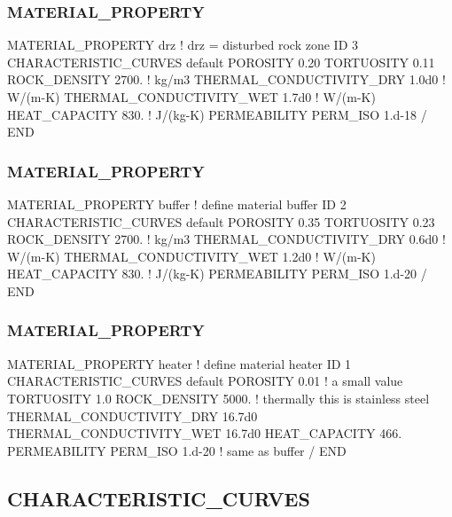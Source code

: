 \documentclass{beamer}
\newcommand\bluecomment[1]{{{\color{blue} #1}}}
\newcommand\greencomment[1]{{{\color{green} #1}}}
\begin{document}
\begin{frame}[fragile]\frametitle{MATERIAL\_PROPERTY}
\begin{semiverbatim}
MATERIAL_PROPERTY drz \bluecomment{!} \greencomment{drz} \bluecomment{= disturbed rock zone}
  ID 3
  CHARACTERISTIC_CURVES default
  POROSITY 0.20
  TORTUOSITY 0.11
  ROCK_DENSITY 2700. \bluecomment{! kg/m3}
  THERMAL_CONDUCTIVITY_DRY 1.0d0 \bluecomment{! W/(m-K)}
  THERMAL_CONDUCTIVITY_WET 1.7d0 \bluecomment{! W/(m-K)}
  HEAT_CAPACITY 830. \bluecomment{! J/(kg-K)}
  PERMEABILITY
    PERM_ISO 1.d-18
  /
END
\end{semiverbatim}
\end{frame}

\begin{frame}[fragile]\frametitle{MATERIAL\_PROPERTY}
\begin{semiverbatim}
MATERIAL_PROPERTY buffer \bluecomment{! define material} \greencomment{buffer}
  ID 2
  CHARACTERISTIC_CURVES default
  POROSITY 0.35
  TORTUOSITY 0.23
  ROCK_DENSITY 2700. \bluecomment{! kg/m3}
  THERMAL_CONDUCTIVITY_DRY 0.6d0 \bluecomment{! W/(m-K)}
  THERMAL_CONDUCTIVITY_WET 1.2d0 \bluecomment{! W/(m-K)}
  HEAT_CAPACITY 830. \bluecomment{! J/(kg-K)}
  PERMEABILITY
    PERM_ISO 1.d-20
  /
END
\end{semiverbatim}
\end{frame}

\begin{frame}[fragile]\frametitle{MATERIAL\_PROPERTY}
\begin{semiverbatim}
MATERIAL_PROPERTY heater \bluecomment{! define material} \greencomment{heater}
  ID 1
  CHARACTERISTIC_CURVES default
  POROSITY 0.01 \bluecomment{! a small value}
  TORTUOSITY 1.0
  ROCK_DENSITY 5000. \bluecomment{! thermally this is stainless steel}
  THERMAL_CONDUCTIVITY_DRY 16.7d0 
  THERMAL_CONDUCTIVITY_WET 16.7d0 
  HEAT_CAPACITY 466. 
  PERMEABILITY
    PERM_ISO 1.d-20 \bluecomment{! same as buffer}
  /
END
\end{semiverbatim}
\end{frame}
\subsection{CHARACTERISTIC\_CURVES}
\end{document}
